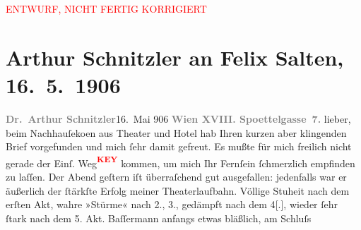 
\begin{center}
            \textcolor{red}{ENTWURF, NICHT FERTIG KORRIGIERT}
                      \end{center}
            
         
         \renewcommand{\erwaehntePersonen}{Personen: Albert Bassermann, Richard Beer-Hofmann, Dora Erl, Julius von Gans-Ludassy, Hugo von Hofmannsthal, Arthur Kaufmann, Anna Loew, Johann Loew, Charlotte Pohl-Glas, Jacob Pollak, Emanuel Reicher, Felix Salten}
         \renewcommand{\erwaehnteOrte}{Orte: Berlin, Brüssel, Dresden, Griechenland, Heringsdorf, Hinterbrühl, Hotel Radetzky, Spanien, Wartburg, Waterloo, Wien, Świnoujście}
         \renewcommand{\erwaehnteWerke}{}
               \section[Arthur Schnitzler an Felix Salten, 16. 5. 1906]{ Arthur Schnitzler an Felix Salten, 16. 5. 1906}\nopagebreak{}\rehead{ }\begin{ledgroupsized}[t]{13cm}\normalsize\beginnumbering \toendnotes[C]{\smallbreak\pagebreak[2]} 
\toendnotes[C]{\smallbreak}\pstart
           \noindent{}{\pb}\textcolor{gray}{\textbf{Dr. Arthur Schnitzler}}\hfill 16. Mai 906\pend
           \pstart
           \textcolor{gray}{\textbf{Wien XVIII.
                        Spoettelgasse 7.}}\pend
           \pstart
           lieber, beim Nachhauſeko{\geminationm}en aus Theater
               und Hotel hab \label{T_L03005-1v}\label{T_L03005-1h} Ihren
               kurzen aber klingenden Brief vorgefunden und mich ſehr damit gefreut. Es mußte für
               mich freilich nicht gerade der Einſ. Weg\textcolor{red}{\textsuperscript{\textbf{KEY}}} kommen, um mich
               Ihr Fernſein ſchmerzlich empfinden zu laſſen. Der Abend geſtern iſt überraſchend gut
               ausgefallen: jedenfalls war er äußerlich der ſtärkſte Erfolg meiner Theaterlaufbahn.
               Völlige Stu{\geminationm}heit nach dem erſten Akt, wahre »Stürme«
               nach 2., 3., gedämpft nach dem 4{[}.{]}, wieder ſehr ſtark {\pb}nach dem 5. Akt. Baſſermann anfangs etwas bläßlich, am Schluſs

\end{ledgroupsized}
